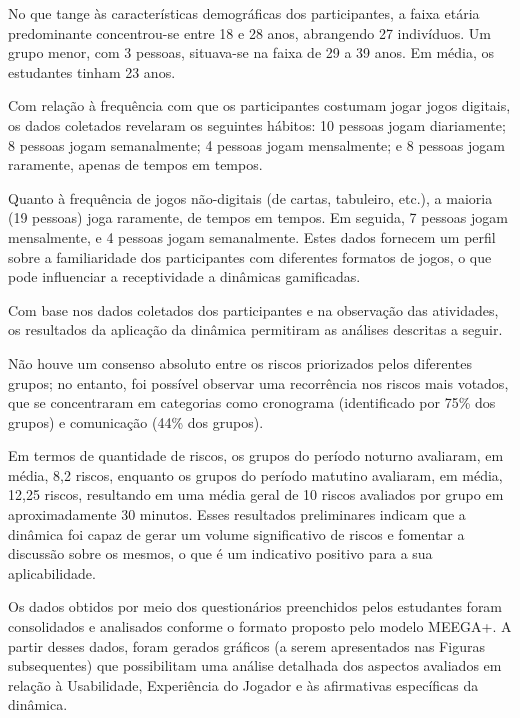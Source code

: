 \documentclass[
	12pt,
	openright,
	twoside,
	a4paper,
	english,
	brazil
	]{abntex2}
\begin{document}
No que tange às características demográficas dos participantes, a faixa etária predominante concentrou-se entre 18 e 28 anos, abrangendo 27 indivíduos. Um grupo menor, com 3 pessoas, situava-se na faixa de 29 a 39 anos. Em média, os estudantes tinham 23 anos.

Com relação à frequência com que os participantes costumam jogar jogos digitais, os dados coletados revelaram os seguintes hábitos: 10 pessoas jogam diariamente; 8 pessoas jogam semanalmente; 4 pessoas jogam mensalmente; e 8 pessoas jogam raramente, apenas de tempos em tempos.

Quanto à frequência de jogos não-digitais (de cartas, tabuleiro, etc.), a maioria (19 pessoas) joga raramente, de tempos em tempos. Em seguida, 7 pessoas jogam mensalmente, e 4 pessoas jogam semanalmente. Estes dados fornecem um perfil sobre a familiaridade dos participantes com diferentes formatos de jogos, o que pode influenciar a receptividade a dinâmicas gamificadas.

Com base nos dados coletados dos participantes e na observação das atividades, os resultados da aplicação da dinâmica permitiram as análises descritas a seguir.

Não houve um consenso absoluto entre os riscos priorizados pelos diferentes grupos; no entanto, foi possível observar uma recorrência nos riscos mais votados, que se concentraram em categorias como cronograma (identificado por 75\% dos grupos) e comunicação (44\% dos grupos).

Em termos de quantidade de riscos, os grupos do período noturno avaliaram, em média, 8,2 riscos, enquanto os grupos do período matutino avaliaram, em média, 12,25 riscos, resultando em uma média geral de 10 riscos avaliados por grupo em aproximadamente 30 minutos. Esses resultados preliminares indicam que a dinâmica foi capaz de gerar um volume significativo de riscos e fomentar a discussão sobre os mesmos, o que é um indicativo positivo para a sua aplicabilidade.

Os dados obtidos por meio dos questionários preenchidos pelos estudantes foram consolidados e analisados conforme o formato proposto pelo modelo MEEGA+. A partir desses dados, foram gerados gráficos (a serem apresentados nas Figuras subsequentes) que possibilitam uma análise detalhada dos aspectos avaliados em relação à Usabilidade, Experiência do Jogador e às afirmativas específicas da dinâmica.
\end{document}

